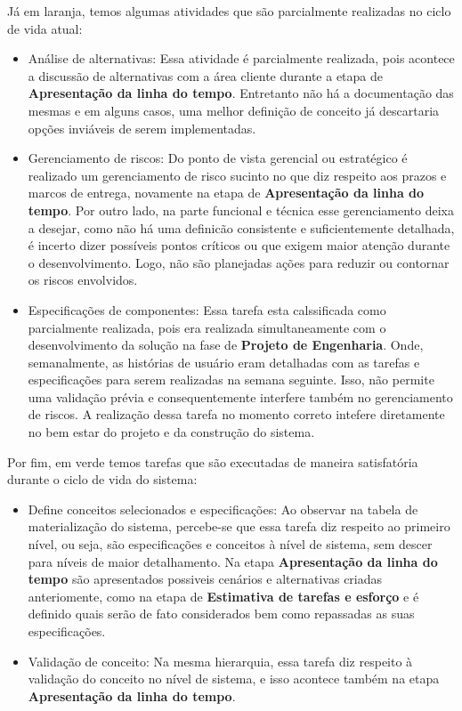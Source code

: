 	Já em laranja, temos algumas atividades que são parcialmente realizadas no ciclo de vida atual:
	\begin{itemize}
		\item Análise de alternativas: Essa atividade é parcialmente realizada, pois acontece a discussão de alternativas com
		a área cliente durante a etapa de \textbf{Apresentação da linha do tempo}. Entretanto não há a documentação das mesmas e em alguns casos, uma melhor definição de conceito já descartaria opções
		inviáveis de serem implementadas.  
		\item Gerenciamento de riscos: Do ponto de vista gerencial ou estratégico é realizado um gerenciamento de risco sucinto no que
		diz respeito aos prazos e marcos de entrega, novamente na etapa de \textbf{Apresentação da linha do tempo}. Por outro lado, na parte funcional e técnica esse gerenciamento deixa a desejar, como não
		há uma definicão consistente e suficientemente detalhada, é incerto dizer possíveis pontos críticos ou que exigem maior atenção durante o desenvolvimento.
		Logo, não são planejadas ações para reduzir ou contornar os riscos envolvidos.
		\item Especificações de componentes: Essa tarefa esta calssificada como parcialmente realizada, pois era realizada simultaneamente com o desenvolvimento da solução na fase de \textbf{Projeto de Engenharia}.
		Onde, semanalmente, as histórias de usuário eram detalhadas com as tarefas e especificações para serem realizadas na semana seguinte. Isso, não permite uma validação prévia e consequentemente interfere também no gerenciamento de riscos.
		A realização dessa tarefa no momento correto intefere diretamente no bem estar do projeto e da construção do sistema.
	\end{itemize}

	Por fim, em verde temos tarefas que são executadas de maneira satisfatória durante o ciclo de vida do sistema:
	\begin{itemize}
		\item Define conceitos selecionados e especificações: Ao observar na tabela de materialização do sistema, percebe-se que essa tarefa diz
		respeito ao primeiro nível, ou seja, são especificações e conceitos à nível de sistema, sem descer para níveis de maior detalhamento. Na
		etapa \textbf{Apresentação da linha do tempo} são apresentados possiveis cenários e alternativas criadas anteriomente, como na etapa
		de \textbf{Estimativa de tarefas e esforço} e é definido quais serão de fato considerados bem como repassadas as suas especificações.
		\item Validação de conceito: Na mesma hierarquia, essa tarefa diz respeito à validação do conceito no nível de sistema, e isso 
		acontece também na etapa \textbf{Apresentação da linha do tempo}.
	\end{itemize}

